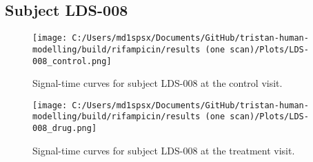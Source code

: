 \documentclass{epflreport}%
\begin{document}
\subsection{Subject LDS{-}008}%
\label{subsec:SubjectLDS{-}008}%

%


\begin{figure}[h!]%
\centering%
\texttt{[image: C:/Users/md1spsx/Documents/GitHub/tristan-human-modelling/build/rifampicin/results (one scan)/Plots/LDS-008\_control.png]}%
\caption{Signal{-}time curves for subject LDS{-}008 at the control visit.}%
\end{figure}

%


\begin{figure}[h!]%
\centering%
\texttt{[image: C:/Users/md1spsx/Documents/GitHub/tristan-human-modelling/build/rifampicin/results (one scan)/Plots/LDS-008\_drug.png]}%
\caption{Signal{-}time curves for subject LDS{-}008 at the treatment visit.}%
\end{figure}
\end{document}
